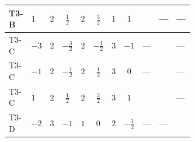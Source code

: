 \documentclass[8pt]{article}
\begin{document}
\begin{landscape}
\begin{longtable}{@{}llcccccc >{\raggedright\arraybackslash}p{0.21\linewidth} >{\raggedright\arraybackslash}p{0.21\linewidth} >{\raggedright\arraybackslash}p{0.21\linewidth}@{}}
\midrule
T3-B & $1$ & $2$ & $\frac{1}{2}$ & $2$ & $\frac{3}{2}$ & $1$ & $1$ & \scriptsize\adjustbox{max width=\linewidth}{$\begin{gathered} +{g_1}^2 \left(6 {g_2}^2-3 {\lambda_{HS_1}^{(A)}}\right)\end{gathered}$} & --- & --- \\
\midrule
T3-C & $-3$ & $2$ & $-\frac{3}{2}$ & $2$ & $-\frac{1}{2}$ & $3$ & $-1$ & --- & \scriptsize\adjustbox{max width=\linewidth}{$\begin{gathered} {\lambda_{HS_1}^{(A)}} (3 T_{\nu}^{(1)}+6 \operatorname{Tr}\!\left({Y_d}\,\left({Y_d}\right)^{\dagger}\right)+2 \operatorname{Tr}\!\left({Y_e}\,\left({Y_e}\right)^{\dagger}\right)+6 \operatorname{Tr}\!\left({Y_u}\,\left({Y_u}\right)^{\dagger}\right))\end{gathered}$} & --- \\
\midrule
T3-C & $-1$ & $2$ & $-\frac{1}{2}$ & $2$ & $\frac{1}{2}$ & $3$ & $0$ & --- & \scriptsize\adjustbox{max width=\linewidth}{$\begin{gathered} {\lambda_{HS_1}^{(A)}} (3 T_{\nu}^{(1)}+6 \operatorname{Tr}\!\left({Y_d}\,\left({Y_d}\right)^{\dagger}\right)+2 \operatorname{Tr}\!\left({Y_e}\,\left({Y_e}\right)^{\dagger}\right)+6 \operatorname{Tr}\!\left({Y_u}\,\left({Y_u}\right)^{\dagger}\right))\end{gathered}$} & --- \\
\midrule
T3-C & $1$ & $2$ & $\frac{1}{2}$ & $2$ & $\frac{3}{2}$ & $3$ & $1$ & \scriptsize\adjustbox{max width=\linewidth}{$\begin{gathered} +{g_1}^2 \left(6 {g_2}^2-3 {\lambda_{HS_1}^{(A)}}\right)\end{gathered}$} & \scriptsize\adjustbox{max width=\linewidth}{$\begin{gathered} {\lambda_{HS_1}^{(A)}} (3 T_{\nu}^{(1)}+6 \operatorname{Tr}\!\left({Y_d}\,\left({Y_d}\right)^{\dagger}\right)+2 \operatorname{Tr}\!\left({Y_e}\,\left({Y_e}\right)^{\dagger}\right)+6 \operatorname{Tr}\!\left({Y_u}\,\left({Y_u}\right)^{\dagger}\right))\end{gathered}$} & --- \\
\midrule
T3-D & $-2$ & $3$ & $-1$ & $1$ & $0$ & $2$ & $-\frac{1}{2}$ & --- & --- & \scriptsize\adjustbox{max width=\linewidth}{$\begin{gathered} {\lambda_{HS_1}^{(A)}} (2 T_{\nu}^{(1)}+6 \operatorname{Tr}\!\left({Y_d}\,\left({Y_d}\right)^{\dagger}\right)+2 \operatorname{Tr}\!\left({Y_e}\,\left({Y_e}\right)^{\dagger}\right)+6 \operatorname{Tr}\!\left({Y_u}\,\left({Y_u}\right)^{\dagger}\right)+16 {\lambda_{S_1}^{(A)}})\end{gathered}$} \\

\end{longtable}
\end{landscape}
\end{document}
